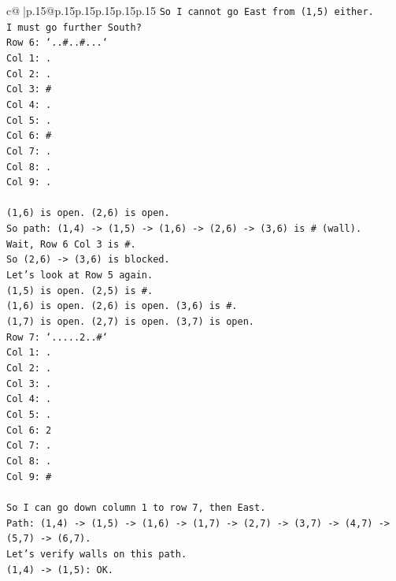 \documentclass{article}
\begin{document}
{\begin{supertabular}{c@{$\;$}|p{.15\linewidth}@{}p{.15\linewidth}p{.15\linewidth}p{.15\linewidth}p{.15\linewidth}p{.15\linewidth}}
{{{\texttt{So I cannot go East from (1,5) either.} \\
\texttt{I must go further South?} \\
\texttt{Row 6: `..\#..\#...`} \\
\texttt{Col 1: .} \\
\texttt{Col 2: .} \\
\texttt{Col 3: \#} \\
\texttt{Col 4: .} \\
\texttt{Col 5: .} \\
\texttt{Col 6: \#} \\
\texttt{Col 7: .} \\
\texttt{Col 8: .} \\
\texttt{Col 9: .} \\
\\ 
\texttt{(1,6) is open. (2,6) is open.} \\
\texttt{So path: (1,4) {-}> (1,5) {-}> (1,6) {-}> (2,6) {-}> (3,6) is \# (wall).} \\
\texttt{Wait, Row 6 Col 3 is \#.} \\
\texttt{So (2,6) {-}> (3,6) is blocked.} \\
\texttt{Let's look at Row 5 again.} \\
\texttt{(1,5) is open. (2,5) is \#.} \\
\texttt{(1,6) is open. (2,6) is open. (3,6) is \#.} \\
\texttt{(1,7) is open. (2,7) is open. (3,7) is open.} \\
\texttt{Row 7: `.....2..\#`} \\
\texttt{Col 1: .} \\
\texttt{Col 2: .} \\
\texttt{Col 3: .} \\
\texttt{Col 4: .} \\
\texttt{Col 5: .} \\
\texttt{Col 6: 2} \\
\texttt{Col 7: .} \\
\texttt{Col 8: .} \\
\texttt{Col 9: \#} \\
\\ 
\texttt{So I can go down column 1 to row 7, then East.} \\
\texttt{Path: (1,4) {-}> (1,5) {-}> (1,6) {-}> (1,7) {-}> (2,7) {-}> (3,7) {-}> (4,7) {-}> (5,7) {-}> (6,7).} \\
\texttt{Let's verify walls on this path.} \\
\texttt{(1,4) {-}> (1,5): OK.} \\
}}}
\end{supertabular}}
\end{document}
